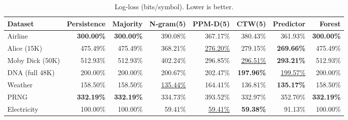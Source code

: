 \begin{table}[h]
\centering
\caption{Log-loss (bits/symbol). Lower is better.}
\label{tab:logloss}
\begin{tabular}{lrrrrrrr}
\toprule
Dataset & Persistence & Majority & N-gram(5) & PPM-D(5) & CTW(5) & Predictor & Forest \\
\midrule
Airline & \textbf{300.00\%} & \textbf{300.00\%} & 390.08\% & 367.17\% & 380.43\% & 361.93\% & \textbf{300.00\%} \\
Alice (15K) & 475.49\% & 475.49\% & 368.21\% & \underline{276.20\%} & 279.15\% & \textbf{269.66\%} & 475.49\% \\
Moby Dick (50K) & 512.93\% & 512.93\% & 402.24\% & 296.85\% & \underline{296.51\%} & \textbf{293.21\%} & 512.93\% \\
DNA (full 48K) & 200.00\% & 200.00\% & 200.67\% & 202.47\% & \textbf{197.96\%} & \underline{199.57\%} & 200.00\% \\
Weather & 158.50\% & 158.50\% & \underline{135.44\%} & 164.41\% & 136.81\% & \textbf{135.17\%} & 158.50\% \\
PRNG & \textbf{332.19\%} & \textbf{332.19\%} & 334.73\% & 393.52\% & 332.97\% & 352.70\% & \textbf{332.19\%} \\
Electricity & 100.00\% & 100.00\% & 59.41\% & \underline{59.41\%} & \textbf{59.38\%} & 91.13\% & 100.00\% \\
\bottomrule
\end{tabular}
\end{table}
